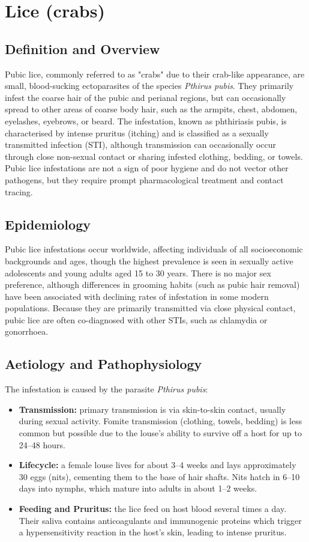 \chapter{Lice (crabs)}

\section*{Definition and Overview}
Pubic lice, commonly referred to as "crabs" due to their crab-like appearance, are small, blood-sucking ectoparasites of the species \textit{Pthirus pubis}. They primarily infest the coarse hair of the pubic and perianal regions, but can occasionally spread to other areas of coarse body hair, such as the armpits, chest, abdomen, eyelashes, eyebrows, or beard. The infestation, known as phthiriasis pubis, is characterised by intense pruritus (itching) and is classified as a sexually transmitted infection (STI), although transmission can occasionally occur through close non-sexual contact or sharing infested clothing, bedding, or towels. Pubic lice infestations are not a sign of poor hygiene and do not vector other pathogens, but they require prompt pharmacological treatment and contact tracing.

\section*{Epidemiology}
Pubic lice infestations occur worldwide, affecting individuals of all socioeconomic backgrounds and ages, though the highest prevalence is seen in sexually active adolescents and young adults aged 15 to 30 years. There is no major sex preference, although differences in grooming habits (such as pubic hair removal) have been associated with declining rates of infestation in some modern populations. Because they are primarily transmitted via close physical contact, pubic lice are often co-diagnosed with other STIs, such as chlamydia or gonorrhoea.

\section*{Aetiology and Pathophysiology}
The infestation is caused by the parasite \textit{Pthirus pubis}:

\begin{itemize}
    \item \textbf{Transmission:} primary transmission is via skin-to-skin contact, usually during sexual activity. Fomite transmission (clothing, towels, bedding) is less common but possible due to the louse's ability to survive off a host for up to 24--48 hours.
    \item \textbf{Lifecycle:} a female louse lives for about 3--4 weeks and lays approximately 30 eggs (nits), cementing them to the base of hair shafts. Nits hatch in 6--10 days into nymphs, which mature into adults in about 1--2 weeks.
    \item \textbf{Feeding and Pruritus:} the lice feed on host blood several times a day. Their saliva contains anticoagulants and immunogenic proteins which trigger a hypersensitivity reaction in the host's skin, leading to intense pruritus.
\end{itemize}

